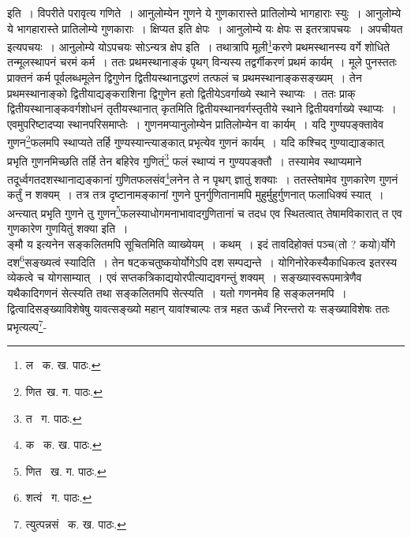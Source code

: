 \documentclass[11pt, openany]{book}
\begin{document}
{\newpage

\noindent इति~। विपरीते परावृत्य गणिते~। आनुलोम्येन गुणने ये गुणकारास्ते प्रातिलोम्ये भागहाराः स्युः~। आनुलोम्ये ये भागहारास्ते प्रातिलोम्ये गुणकाराः~। क्षिप्यत इति क्षेपः~। आनुलोम्ये यः क्षेपः स इतरत्रापचयः~। अपचीयत इत्यपचयः~। आनुलोम्ये योऽपचयः सोऽन्यत्र क्षेप इति~। तथात्रापि मूली\renewcommand{\thefootnote}{१}\footnote{ल \textendash\ क. ख. पाठः.}करणे प्रथमस्थानस्य वर्गे शोधिते तन्मूलस्थापनं चरमं कर्म~। ततः प्रथमस्थानाङ्कं पृथग् विन्यस्य तद्वर्गीकरणं प्रथमं कार्यम्~। मूले पुनस्ततः प्राक्तनं कर्म पूर्वलब्धमूलेन द्विगुणेन द्वितीयस्थानाद्धरणं तत्फलं च प्रथमस्थानाङ्कसङ्ख्यम्~। तेन प्रथमस्थानाङ्को द्वितीयाद्यङ्कराशिना द्विगुणेन हतो द्वितीयेऽवर्गाख्ये स्थाने स्थाप्यः~। ततः प्राक् द्वितीयस्थानाङ्कवर्गशोधनं तृतीयस्थानात् कृतमिति द्वितीयस्थानवर्गस्तृतीये स्थाने द्वितीयवर्गाख्ये स्थाप्यः~। एवमुपरिष्टादप्या स्थानपरिसमाप्तेः~। गुणनमप्यानुलोम्येन प्रातिलोम्येन वा कार्यम्~। यदि गुण्यपङ्क्तावेव गुणन\renewcommand{\thefootnote}{२}\footnote{णित\textendash\ ख. ग. पाठः.}फलमपि स्थाप्यते तर्हि गुण्यस्यान्त्याङ्कात् प्रभृत्येव गुणनं कार्यम्~। यदि कश्चिद् गुण्याद्याङ्कात् प्रभृति गुणनमिच्छति तर्हि तेन बहिरेव गुणितं\renewcommand{\thefootnote}{३}\footnote{त \textendash\ ग. पाठः.} फलं स्थाप्यं न गुण्यपङ्क्तौ~। तस्यामेव स्थाप्यमाने तदूर्ध्वगतदशस्थानाद्यङ्कानां गुणितफलसंव\renewcommand{\thefootnote}{४}\footnote{क \textendash\ क. ख. पाठः.}लनेन ते न पृथग् ज्ञातुं शक्याः~। ततस्तेषामेव गुणकारेण गुणनं कर्तुं न शक्यम्~। तत्र तत्र दृष्टानामङ्कानां गुणने पुनर्गुणितानामपि मुहुर्मुहुर्गुणनात् फलाधिक्यं स्यात्~। अन्त्यात् प्रभृति गुणने तु गुणन\renewcommand{\thefootnote}{५}\footnote{णित \textendash\ ख. ग. पाठः.}फलस्याधोगमनाभावादगुणितानां च तदध एव स्थितत्वात् तेषामविकारात् त एव गुणकारेण गुणयितुं शक्या इति~।\\

ङ्मौ य इत्यनेन सङ्कलितमपि सूचितमिति व्याख्येयम्~। कथम्~। इदं तावदिहोक्तं पञ्च(तो ? कयो)र्योगे दश\renewcommand{\thefootnote}{८}\footnote{शत्वं \textendash\ ग. पाठः.}सङ्ख्यत्वं स्यादिति~। तेन षट्कचतुष्कयोर्योगेऽपि दश सम्पद्यन्ते~। योगिनोरेकस्यैकाधिकत्व इतरस्य व्येकत्वे च योगसाम्यात्~। एवं सप्तकत्रिकाद्ययोरपीत्याद्यवगन्तुं शक्यम्~। सङ्ख्यास्वरूपमात्रेणैव यथैकादिगणनं सेत्स्यति तथा सङ्कलितमपि सेत्स्यति~। यतो गणनमेव हि सङ्कलनमपि~। द्वित्वादिसङ्ख्याविशेषेषु यावत्सङ्ख्यो महान् यावांश्चाल्पः तत्र महत ऊर्ध्वं निरन्तरो यः सङ्ख्याविशेषः ततः प्रभृत्यल्प\renewcommand{\thefootnote}{७}\footnote{त्युत्पन्नसं \textendash\ क. ख. पाठः.}-

\newpage

}
\end{document}
